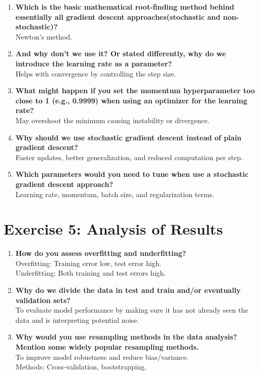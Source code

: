 \documentclass[a4paper,12pt]{article}
\begin{document}
	\begin{enumerate}
		\item \textbf{Which is the basic mathematical root-finding method behind essentially all gradient descent approaches(stochastic and non-stochastic)?} \\
		Newton's method.
		
		\item \textbf{And why don’t we use it? Or stated differently, why do we introduce the learning rate as a parameter?} \\
		Helps with convergence by controlling the step size.
		
		\item \textbf{What might happen if you set the momentum hyperparameter too close to 1 (e.g., 0.9999) when using an optimizer for the learning rate?} \\
		May overshoot the minimum causing instability or divergence.
		
		\item \textbf{Why should we use stochastic gradient descent instead of plain gradient descent?} \\
		Faster updates, better generalization, and reduced computation per step.
		
		\item \textbf{Which parameters would you need to tune when use a stochastic gradient descent approach?} \\
		Learning rate, momentum, batch size, and regularization terms.
	\end{enumerate}
	
	\section*{Exercise 5: Analysis of Results}
	
	\begin{enumerate}
		\item \textbf{How do you assess overfitting and underfitting?} \\
		Overfitting: Training error low, test error high. \\
		Underfitting: Both training and test errors high.
		
		\item \textbf{Why do we divide the data in test and train and/or eventually validation sets?} \\
		To evaluate model performance by making sure it has not already seen the data and is interpreting potential noise.
		
		\item \textbf{Why would you use resampling methods in the data analysis? Mention some widely popular resampling methods.} \\
		To improve model robustness and reduce bias/variance. \\
		Methods: Cross-validation, bootstrapping.
	\end{enumerate}
	
\end{document}
